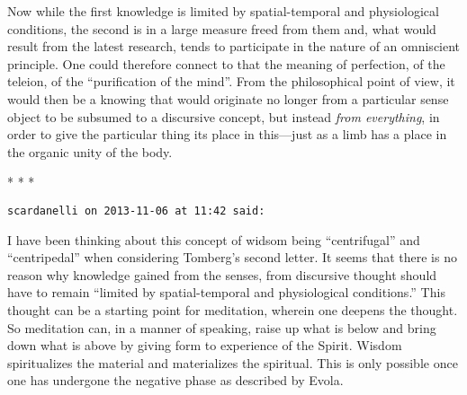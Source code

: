 Now while the first knowledge is limited by spatial-temporal and physiological conditions, the second is in a large measure freed from them and, what would result from the latest research, tends to participate in the nature of an omniscient principle. One could therefore connect to that the meaning of perfection, of the teleion, of the “purification of the mind”. From the philosophical point of view, it would then be a knowing that would originate no longer from a particular sense object to be subsumed to a discursive concept, but instead \textit{from everything}, in order to give the particular thing its place in this—just as a limb has a place in the organic unity of the body.




\begin{center}* * *\end{center}

\begin{footnotesize}\begin{sffamily}



\texttt{scardanelli on 2013-11-06 at 11:42 said: }

I have been thinking about this concept of widsom being “centrifugal” and “centripedal” when considering Tomberg's second letter. It seems that there is no reason why knowledge gained from the senses, from discursive thought should have to remain “limited by spatial-temporal and physiological conditions.” This thought can be a starting point for meditation, wherein one deepens the thought. So meditation can, in a manner of speaking, raise up what is below and bring down what is above by giving form to experience of the Spirit. Wisdom spiritualizes the material and materializes the spiritual. This is only possible once one has undergone the negative phase as described by Evola.


\hfill


\end{sffamily}\end{footnotesize}
